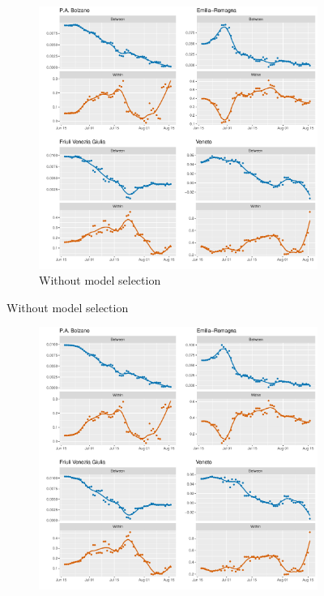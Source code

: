 \documentclass[12pt]{article}
\begin{document}
\begin{appendices}
		\begin{figure}[H]
    	    \centering
    	    \begin{subfigure}{\textwidth}
    	      \centering
    	      \includegraphics[width=\linewidth]{output/model_between_lag14_betas_Nord-Est_rolling.pdf}
    	      \caption{Without model selection}
    	      \label{fig:beta_between_over_time_nordest_regular}
    	    \end{subfigure}
        \end{figure}
        \begin{figure}[H]\ContinuedFloat
    	    \begin{subfigure}{\textwidth}
    	      \centering
    	      \includegraphics[width=\linewidth]{output/model_between_lag14_betas_Nord-Est_aic_rolling.pdf}

\end{subfigure}
\end{figure}
\end{appendices}
\end{document}
